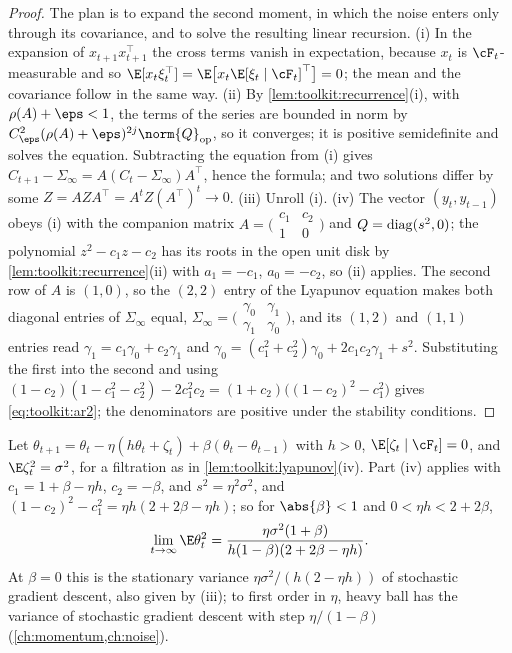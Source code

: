 \begin{refsection}
\begin{proof}
The plan is to expand the second moment, in which the noise enters only through its covariance, and to solve the resulting linear recursion. (i) In the expansion of $x_{t+1}x_{t+1}^\top$ the cross terms vanish in expectation, because $x_t$ is $\cF_t$-measurable and so $\E[x_t\xi_t^\top]=\E\bigl[x_t\E[\xi_t\mid\cF_t]^\top\bigr]=0$; the mean and the covariance follow in the same way. (ii) By \cref{lem:toolkit:recurrence}(i), with $\rho(A)+\eps<1$, the terms of the series are bounded in norm by $C_\eps^2(\rho(A)+\eps)^{2j}\norm{Q}_{\op}$, so it converges; it is positive semidefinite and solves the equation. Subtracting the equation from (i) gives $C_{t+1}-\Sigma_\infty=A(C_t-\Sigma_\infty)A^\top$, hence the formula; and two solutions differ by some $Z=AZA^\top=A^tZ(A^\top)^t\to0$. (iii) Unroll (i). (iv) The vector $(y_t,y_{t-1})$ obeys (i) with the companion matrix $A=\bigl(\begin{smallmatrix}c_1&c_2\\1&0\end{smallmatrix}\bigr)$ and $Q=\operatorname{diag}(s^2,0)$; the polynomial $z^2-c_1z-c_2$ has its roots in the open unit disk by \cref{lem:toolkit:recurrence}(ii) with $a_1=-c_1$, $a_0=-c_2$, so (ii) applies. The second row of $A$ is $(1,0)$, so the $(2,2)$ entry of the Lyapunov equation makes both diagonal entries of $\Sigma_\infty$ equal, $\Sigma_\infty=\bigl(\begin{smallmatrix}\gamma_0&\gamma_1\\\gamma_1&\gamma_0\end{smallmatrix}\bigr)$, and its $(1,2)$ and $(1,1)$ entries read $\gamma_1=c_1\gamma_0+c_2\gamma_1$ and $\gamma_0=(c_1^2+c_2^2)\gamma_0+2c_1c_2\gamma_1+s^2$. Substituting the first into the second and using $(1-c_2)(1-c_1^2-c_2^2)-2c_1^2c_2=(1+c_2)\bigl((1-c_2)^2-c_1^2\bigr)$ gives \eqref{eq:toolkit:ar2}; the denominators are positive under the stability conditions.
\end{proof}

\begin{example}\label{exa:toolkit:heavyball}
Let $\theta_{t+1}=\theta_t-\eta(h\theta_t+\zeta_t)+\beta(\theta_t-\theta_{t-1})$ with $h>0$, $\E[\zeta_t\mid\cF_t]=0$, and $\E\zeta_t^2=\sigma^2$, for a filtration as in \cref{lem:toolkit:lyapunov}(iv). Part (iv) applies with $c_1=1+\beta-\eta h$, $c_2=-\beta$, and $s^2=\eta^2\sigma^2$, and $(1-c_2)^2-c_1^2=\eta h(2+2\beta-\eta h)$; so for $\abs{\beta}<1$ and $0<\eta h<2+2\beta$,
\[
  \lim_{t\to\infty}\E\theta_t^2=\frac{\eta\sigma^2(1+\beta)}{h(1-\beta)(2+2\beta-\eta h)} .
\]
At $\beta=0$ this is the stationary variance $\eta\sigma^2/(h(2-\eta h))$ of stochastic gradient descent, also given by (iii); to first order in $\eta$, heavy ball has the variance of stochastic gradient descent with step $\eta/(1-\beta)$ (\cref{ch:momentum,ch:noise}).
\end{example}


\end{refsection}
